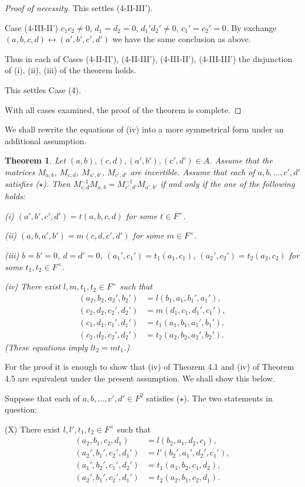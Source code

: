 \documentclass{article}
\newtheorem{thm}{Theorem}[section]
\begin{document}
\begin{proof}[Proof of necessity]
This settles (4-II-III').

\medskip
Case (4-III-II') $c_1c_2\ne 0$, $d_1=d_2=0$, $d_1'd_2'\ne 0$, $c_1'=c_2'=0$.
By exchange $(a,b,c,d)\leftrightarrow (a',b',c',d')$
we  have the same conclusion as above.

Thus in each of Cases (4-II-II'), (4-II-III'), (4-III-II'), (4-III-III')  the disjunction of  (i), (ii), (iii) of the theorem holds.

This settles Case (4).

With all cases examined, the proof of the theorem is complete.

\end{proof}


\bigskip
We shall rewrite the equations of (iv) into a more symmetrical form
under an additional assumption.

\begin{thm}
Let $(a,b), (c,d), (a',b'), (c',d')\in A$.
Assume that the matrices $M_{a,b}$, $M_{c,d}$, $M_{a',b'}$, $M_{c',d'}$ are invertible.
Assume that each of $a,b,\dots,c',d'$ satisfies ($\star$).
Then  $M_{c,d}^{-1}M_{a,b}= M_{c',d'}^{-1}M_{a',b'}$ if and only if the one of the following holds:

 
(i) $(a',b',c',d')=t(a,b,c,d)$ for some $t\in F^{\times}$.

(ii) $(a,b,a',b')=m(c,d,c',d')$ for some $m\in F^{\times}$.

(iii) $b=b'=0$, $d=d'=0$, $(a_1',c_1')=t_1(a_1,c_1)$, $(a_2',c_2')=t_2(a_2,c_2)$ for some $t_1,t_2\in F^{\times}$.

(iv) 
There exist $l,m,t_1,t_2\in F^{\times}$ such that
\begin{align*}
(a_2,b_2,a_2',b_2')&=l(b_1,a_1,b_1',a_1'), \\
(c_2,d_2,c_2',d_2')&=m(d_1,c_1,d_1',c_1') ,\\
(c_1,d_1,c_1',d_1')&=t_1(a_1,b_1,a_1',b_1'), \\
(c_2,d_2,c_2',d_2')&=t_2(a_2,b_2,a_2',b_2'). 
\end{align*}
(These equations imply $lt_2=mt_1$.)

\end{thm}

For the proof it is enough to show that  
 (iv) of Theorem 4.1 and (iv) of Theorem 4.5 are equivalent
under the present assumption.
We shall show this below.

Suppose that each of $a,b,\dots,c',d'\in F^2$ satisfies ($\star$).
The two statements in question:

(X) There exist $l,l',t_1,t_2\in F^{\times}$ such that
\begin{align*}
(a_2,b_1,c_2,d_1)&=l(b_2,a_1,d_2,c_1), \\
(a_2',b_1',c_2',d_1')&=l'(b_2',a_1',d_2',c_1'), \\
(a_1',b_2',c_1',d_2')&=t_1(a_1,b_2,c_1,d_2), \\
(a_2',b_1',c_2',d_1')&=t_2(a_2,b_1,c_2,d_1). 
\end{align*}
\end{document}
